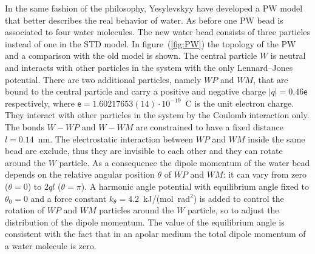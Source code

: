 In the same fashion of the \martini{} philosophy, Yesylevskyy \etal{} \cite{PW} have developed a \acf{PW} model
that better describes the real behavior of water. As before one \ac{PW} bead is associated to four water
molecules. The new water bead consists of three particles instead of one in the \ac{STD} \martini{} model. In
figure~(\ref{fig:PW}) the topology of the \ac{PW} and a comparison with the old model is shown. The central
particle $W$ is neutral and interacts with other particles in the system with the only Lennard--Jones potential.
There are two additional particles, namely $WP$ and $WM$, that are bound to the central particle and carry a
positive and negative charge $|q| = 0.46\mathsf{e}$ respectively, where
$\mathsf{e} = 1.60217653(14) \cdot 10^{-19}$~C is the unit electron charge. They interact with other particles in
the system by the Coulomb interaction only. The bonds $W-WP$ and $W-WM$ are constrained to have a fixed distance
$l = 0.14$~nm. The electrostatic interaction between $WP$ and $WM$ inside the same bead are exclude, thus they
are invisible to each other and they can rotate around the $W$ particle. As a consequence the dipole momentum of
the water bead depends on the relative angular position $\theta$ of $WP$ and $WM$: it can vary from zero
($\theta = 0$) to $2ql$ ($\theta = \pi$). A harmonic angle potential with equilibrium angle fixed to
$\theta_0 = 0$ and a force constant $k_\theta = 4.2$~kJ/(mol\ rad$^2$) is added to control the rotation of
$WP$ and $WM$ particles around the $W$ particle, so to adjust the distribution of the dipole momentum. The value
of the equilibrium angle is consistent with the fact that in an apolar medium the total dipole momentum of a
water molecule is zero.

